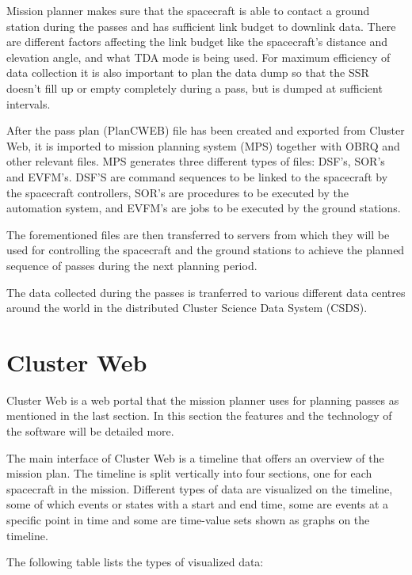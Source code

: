 Mission planner makes sure that the spacecraft is able to contact a ground station during the passes and has sufficient link budget to downlink data. There are different factors affecting the link budget like the spacecraft's distance and elevation angle, and what TDA mode is being used. For maximum efficiency of data collection it is also important to plan the data dump so that the SSR doesn't fill up or empty completely during a pass, but is dumped at sufficient intervals.

After the pass plan (PlanCWEB) file has been created and exported from Cluster Web, it is imported to mission planning system (MPS) together with OBRQ and other relevant files. MPS generates three different types of files: DSF's, SOR's and EVFM's. DSF'S are command sequences to be linked to the spacecraft  by the spacecraft controllers, SOR's are procedures to be executed by the automation system, and EVFM's are jobs to be executed by the ground stations.

The forementioned files are then transferred to servers from which they will be used for controlling the spacecraft and the ground stations to achieve the planned sequence of passes during the next planning period.

The data collected during the passes is tranferred to various different data centres around the world in the distributed Cluster Science Data System (CSDS).

\section{Cluster Web}
Cluster Web is a web portal that the mission planner uses for planning passes as mentioned in the last section. In this section the features and the technology of the software will be detailed more.

The main interface of Cluster Web is a timeline that offers an overview of the mission plan. The timeline is split vertically into four sections, one for each spacecraft in the mission. Different types of data are visualized on the timeline, some of which events or states with a start and end time, some are events at a specific point in time and some are time-value sets shown as graphs on the timeline.

The following table lists the types of visualized data:

